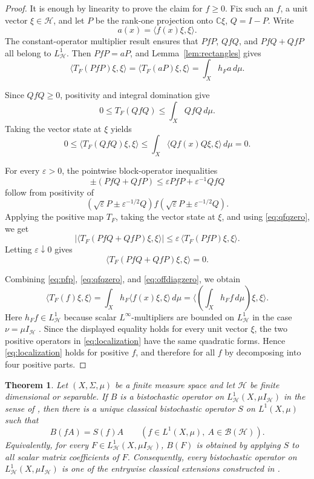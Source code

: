 \documentclass[11pt]{article}
\newtheorem{theorem}{Theorem}
\newcommand{\BH}{\mathcal B(\mathcal H)}
\newcommand{\HH}{\mathcal H}
\newcommand{\ip}[2]{\langle #1,#2\rangle}
\begin{document}
\begin{proof}
It is enough by linearity to prove the claim for \(f\geq0\).  Fix such an
\(f\), a unit vector \(\xi\in\HH\), and let \(P\) be the rank-one projection
onto \(\mathbb C\xi\), \(Q=I-P\).  Write
\[
        a(x)=\ip{f(x)\xi}{\xi}.
\]
The constant-operator multiplier result \cite[Proposition 4.3]{PR} ensures
that \(PfP\), \(QfQ\), and \(PfQ+QfP\) all belong to \(L^1_{\HH}\).
Then \(PfP=aP\), and Lemma~\ref{lem:rectangles} gives
\[
        \ip{T_F(PfP)\xi}{\xi}
        = \ip{T_F(aP)\xi}{\xi}
        = \int_X h_F a\,d\mu.
        \tag{3}\label{eq:pfp}
\]

Since \(QfQ\geq0\), positivity and integral domination give
\[
        0\leq T_F(QfQ)\leq \int_X QfQ\,d\mu.
\]
Taking the vector state at \(\xi\) yields
\[
        0\leq \ip{T_F(QfQ)\xi}{\xi}
        \leq \int_X \ip{Qf(x)Q\xi}{\xi}\,d\mu=0.
        \tag{4}\label{eq:qfqzero}
\]

For every \(\varepsilon>0\), the pointwise block-operator inequalities
\[
        \pm(PfQ+QfP)\leq \varepsilon PfP+\varepsilon^{-1}QfQ
        \tag{5}\label{eq:blockineq}
\]
follow from positivity of
\[
        (\sqrt{\varepsilon}P\pm \varepsilon^{-1/2}Q)
        f
        (\sqrt{\varepsilon}P\pm \varepsilon^{-1/2}Q).
\]
Applying the positive map \(T_F\), taking the vector state at \(\xi\), and
using \eqref{eq:qfqzero}, we get
\[
 \left|\ip{T_F(PfQ+QfP)\xi}{\xi}\right|
 \leq
 \varepsilon\,\ip{T_F(PfP)\xi}{\xi}.
\]
Letting \(\varepsilon\downarrow0\) gives
\[
        \ip{T_F(PfQ+QfP)\xi}{\xi}=0.
        \tag{6}\label{eq:offdiagzero}
\]

Combining \eqref{eq:pfp}, \eqref{eq:qfqzero}, and
\eqref{eq:offdiagzero}, we obtain
\[
        \ip{T_F(f)\xi}{\xi}
        =
        \int_X h_F\ip{f(x)\xi}{\xi}\,d\mu
        =
        \ip{\left(\int_X h_F f\,d\mu\right)\xi}{\xi}.
\]
Here \(h_Ff\in L^1_{\HH}\) because scalar \(L^\infty\)-multipliers are bounded
on \(L^1_{\HH}\) in the case \(\nu=\mu I_{\HH}\) \cite[Lemma 4.1]{PR}.  Since
the displayed equality holds for every unit vector \(\xi\), the two positive
operators in \eqref{eq:localization} have the same quadratic forms.  Hence
\eqref{eq:localization} holds for positive \(f\), and therefore for all
\(f\) by decomposing into four positive parts.
\end{proof}

\begin{theorem}\label{thm:full}
Let \((X,\Sigma,\mu)\) be a finite measure space and let \(\HH\) be finite
dimensional or separable.  If \(B\) is a bistochastic operator on
\(L^1_{\HH}(X,\mu I_{\HH})\) in the sense of \cite{PR}, then there is a unique
classical bistochastic operator \(S\) on \(L^1(X,\mu)\) such that
\[
        B(fA)=S(f)A
        \qquad
        (f\in L^1(X,\mu),\ A\in\BH).
        \tag{7}\label{eq:tensor}
\]
Equivalently, for every \(F\in L^1_{\HH}(X,\mu I_{\HH})\), \(B(F)\) is obtained
by applying \(S\) to all scalar matrix coefficients of \(F\).  Consequently,
every bistochastic operator on \(L^1_{\HH}(X,\mu I_{\HH})\) is one of the
entrywise classical extensions constructed in \cite[Theorem 5.5]{PR}.
\end{theorem}
\end{document}
